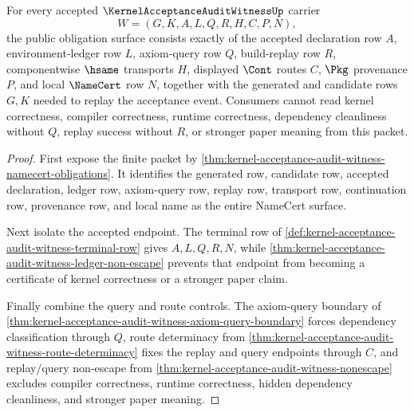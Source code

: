 \begin{theorem}
\label{thm:kernel-acceptance-audit-witness-obligation-surface}
For every accepted $\KernelAcceptanceAuditWitnessUp$ carrier
$$
W=(G,K,A,L,Q,R,H,C,P,N),
$$
the public obligation surface consists exactly of the accepted declaration row $A$, environment-ledger row $L$, axiom-query row $Q$, build-replay row $R$, componentwise $\hsame$ transports $H$, displayed $\Cont$ routes $C$, $\Pkg$ provenance $P$, and local $\NameCert$ row $N$, together with the generated and candidate rows $G,K$ needed to replay the acceptance event. Consumers cannot read kernel correctness, compiler correctness, runtime correctness, dependency cleanliness without $Q$, replay success without $R$, or stronger paper meaning from this packet.
\end{theorem}
\begin{proof}
First expose the finite packet by \autoref{thm:kernel-acceptance-audit-witness-namecert-obligations}. It identifies the generated row, candidate row, accepted declaration, ledger row, axiom-query row, replay row, transport row, continuation row, provenance row, and local name as the entire NameCert surface.

Next isolate the accepted endpoint. The terminal row of \autoref{def:kernel-acceptance-audit-witness-terminal-row} gives $A,L,Q,R,N$, while \autoref{thm:kernel-acceptance-audit-witness-ledger-non-escape} prevents that endpoint from becoming a certificate of kernel correctness or a stronger paper claim.

Finally combine the query and route controls. The axiom-query boundary of \autoref{thm:kernel-acceptance-audit-witness-axiom-query-boundary} forces dependency classification through $Q$, route determinacy from \autoref{thm:kernel-acceptance-audit-witness-route-determinacy} fixes the replay and query endpoints through $C$, and replay/query non-escape from \autoref{thm:kernel-acceptance-audit-witness-nonescape} excludes compiler correctness, runtime correctness, hidden dependency cleanliness, and stronger paper meaning.
\end{proof}

